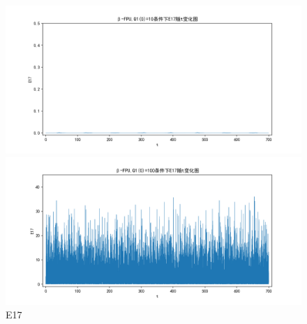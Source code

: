 \documentclass[10pt, a4paper]{article}
\begin{document}
    \begin{figure}[H]
        \begin{minipage}[t]{0.49\textwidth}
            \centering
            \includegraphics[width=\textwidth]{./q6_pics/cmp/E17.png}
        \end{minipage}
        \begin{minipage}[t]{0.49\textwidth}
            \centering
            \includegraphics[width=\textwidth]{./q6_pics/exp/E17.png}
        \end{minipage}
        \caption{E17}\label{fig:E17 in q6}
    \end{figure}
\end{document}
